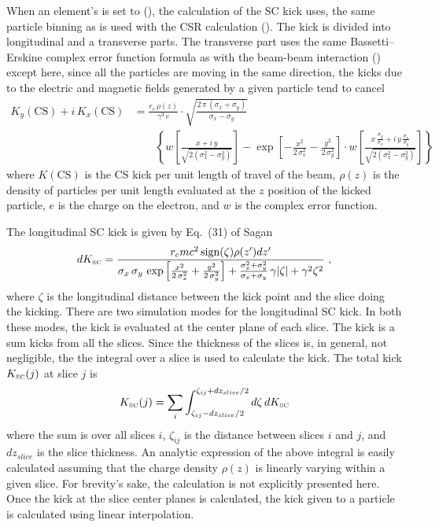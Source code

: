 When an element's  is set to  (), the
calculation of the SC kick uses, the same particle binning as is used with the  CSR
calculation (). The kick is divided into longitudinal and a transverse parts. The
transverse part uses the same Bassetti--Erskine complex error function formula\cite{b:talman} as
with the beam-beam interaction () except here, since all the particles are
moving in the same direction, the kicks due to the electric and magnetic fields generated by a given
particle tend to cancel
\begin{align}
  K_y(\text{CS}) + i \, K_x(\text{CS}) &=
  \frac{r_e \, \rho(z)}{\gamma^3 \, e} \cdot
  \sqrt{\frac{2 \, \pi \, (\sigma_x + \sigma_y)}{\sigma_x - \sigma_y}} \label{fsp1r} \\
  & \qquad \left\{ w \left[ \frac{x + i \, y}{\sqrt{2 (\sigma_x^2 - \sigma_y^2)}} \right] -
  \exp \left[ -\frac{x^2}{2 \, \sigma_x^2} - \frac{y^2}{2 \, \sigma_y^2} \right] \cdot
  w \left[ \frac{x \, \frac{\sigma_y}{\sigma_x} + i \, y \, \frac{\sigma_x}{\sigma_y}}
  {\sqrt{2 (\sigma_x^2 - \sigma_y^2)}} \right] \right\}
  \nonumber
\end{align}
where $K(\text{CS})$ is the CS kick per unit length of travel of the beam, $\rho(z)$ is
the density of particles per unit length evaluated at the $z$ position of the kicked
particle, $e$ is the charge on the electron,  and $w$ is the complex error function.

The longitudinal SC kick is given by Eq.~(31) of Sagan\cite{b:csr} 
\begin{equation}
 d K_{\mbox{\tiny SC}} =
  \frac{ r_c m c^2 \, \mbox{sign}(\zeta)\rho(z')dz'}
  {\sigma_x \, \sigma_y \, \exp
  \left[ \frac{x^2}{2 \, \sigma_x^2} + \frac{y^2}{2 \, \sigma_y^2} \right] +
  \frac{\sigma_x^2 + \sigma_y^2}{\sigma_x + \sigma_y} \, \gamma |\zeta| + \gamma^2\zeta^2}\ ,
  \label{kelsz}
\end{equation}
where $\zeta$ is the longitudinal distance between the kick point and the slice doing the kicking.
There are two simulation modes for the longitudinal SC kick. In both these modes, the kick is
evaluated at the center plane of each slice. The kick is a sum kicks from all the slices. Since the
thickness of the slices is, in general, not negligible, the the integral over a slice is used to
calculate the kick. The total kick $K_{\mbox{\tiny SC}}(j)$ at slice $j$ is
\begin{equation}
  K_{\mbox{\tiny SC}} (j) = 
  \sum_i \int_{\zeta_{ij}-dz_{slice}/2}^{\zeta_{ij}+dz_{slice}/2} d\zeta \, dK_{\mbox{\tiny SC}}
\end{equation}
where the sum is over all slices $i$, $\zeta_{ij}$ is the distance between slices $i$ and $j$, and
$dz_{slice}$ is the slice thickness. An analytic expression of the above integral is easily
calculated assuming that the charge density $\rho(z)$ is linearly varying within a given slice.  For
brevity's sake, the calculation is not explicitly presented here. Once the kick at the slice center
planes is calculated, the kick given to a particle is calculated using linear interpolation.

